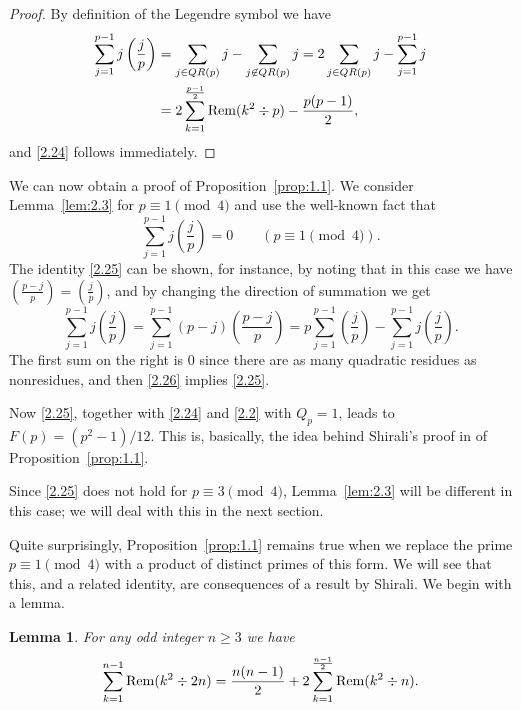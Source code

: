 \documentclass{amsart}
\theoremstyle{plain}
\newtheorem{lemma}[theorem]{Lemma}
\numberwithin{equation}{section}
\begin{document}
\begin{proof}
By definition of the Legendre symbol we have
\begin{align*}
\sum_{j=1}^{p-1}j\left(\frac{j}{p}\right)
&=\sum_{j\in QR(p)}j - \sum_{j\not\in QR(p)}j
= 2\sum_{j\in QR(p)}j - \sum_{j=1}^{p-1}j \\
&= 2\sum_{k=1}^{\frac{p-1}{2}}{\rm Rem}(k^2\div p)-\frac{p(p-1)}{2},
\end{align*}
and \eqref{2.24} follows immediately.
\end{proof}

We can now obtain a proof of Proposition~\ref{prop:1.1}. We consider  
Lemma~\ref{lem:2.3} for $p\equiv 1\pmod{4}$ and use the well-known fact that 
\begin{equation}\label{2.25}
\sum_{j=1}^{p-1}j\left(\frac{j}{p}\right)=0\qquad (p\equiv 1\pmod{4}).
\end{equation}
The identity \eqref{2.25} can be shown, for instance, by noting that in this 
case we have $(\frac{p-j}{p})=(\frac{j}{p})$, and by changing the direction 
of summation we get
\begin{equation}\label{2.26}
\sum_{j=1}^{p-1}j\left(\frac{j}{p}\right)
=\sum_{j=1}^{p-1}(p-j)\left(\frac{p-j}{p}\right)
=p\sum_{j=1}^{p-1}\left(\frac{j}{p}\right)
-\sum_{j=1}^{p-1}j\left(\frac{j}{p}\right).
\end{equation}
The first sum on the right is 0 since there are as many quadratic residues as
nonresidues, and then \eqref{2.26} implies \eqref{2.25}.

Now \eqref{2.25}, together with \eqref{2.24} and \eqref{2.2} with $Q_p=1$,
leads to $F(p)=(p^2-1)/12$. This is, basically, the idea behind
Shirali's proof in \cite{Sh} of Proposition~\ref{prop:1.1}.

Since \eqref{2.25} does not hold for $p\equiv 3\pmod{4}$, Lemma~\ref{lem:2.3}
will be different in this case; we will deal with this in the next section.

\medskip
Quite surprisingly, Proposition~\ref{prop:1.1} remains true when we replace the
prime $p\equiv 1\pmod{4}$ with a product of distinct primes of this form. We 
will see that this, and a related identity, are consequences of a result by 
Shirali. We begin with a lemma.

\begin{lemma}\label{lem:4.1}
For any odd integer $n\geq 3$ we have
\begin{equation}\label{4.1}
\sum_{k=1}^{n-1}{\rm Rem}(k^2\div 2n) = \frac{n(n-1)}{2}
+2\sum_{k=1}^{\frac{n-1}{2}}{\rm Rem}(k^2\div n).
\end{equation}
\end{lemma}
\end{document}
